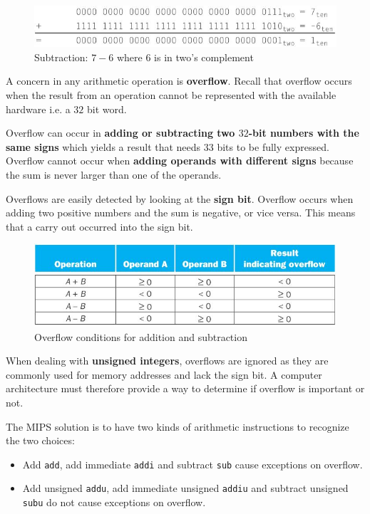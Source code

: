 \documentclass[10pt,a4paper]{article}
\begin{document}
\begin{figure} [h!]
    \centering
    \includegraphics[scale=0.7]{Subtraction.JPG}
    \caption{Subtraction: $7-6$ where $6$ is in two's complement}
\end{figure}

A concern in any arithmetic operation is \textbf{overflow}. Recall that overflow occurs when the
result from an operation cannot be represented with the available hardware i.e. a $32$ bit word.  

Overflow can occur in \textbf{adding or subtracting two $32$-bit numbers with the same signs} which
yields a result that needs $33$ bits to be fully expressed. Overflow cannot occur when
\textbf{adding operands with different signs} because the sum is never larger than one of the
operands. 

\begin{tcolorbox}[breakable,colback=white]
    Overflows are easily detected by looking at the \textbf{sign bit}. Overflow occurs when adding two 
    positive numbers and the sum is negative, or vice versa. This means that a carry out occurred into the sign bit.
\end{tcolorbox}

\begin{figure} [h!]
    \centering
    \includegraphics[scale=0.7]{Overflow.JPG}
    \caption{Overflow conditions for addition and subtraction}
\end{figure}

When dealing with \textbf{unsigned integers}, overflows are ignored as they are commonly used for
memory addresses and lack the sign bit. A computer architecture must therefore provide a way to
determine if overflow is important or not. 

The MIPS solution is to have two kinds of arithmetic instructions to recognize the two choices:
\begin{itemize}
    \item Add \texttt{add}, add immediate \texttt{addi} and subtract \texttt{sub} cause exceptions on 
    overflow.
    \item  Add unsigned \texttt{addu}, add immediate unsigned \texttt{addiu} and subtract unsigned \texttt{subu} do not cause exceptions on overflow.
\end{itemize}
\end{document}
